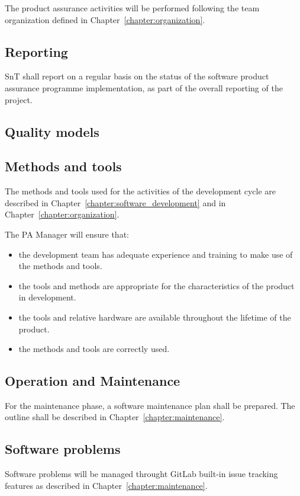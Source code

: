 The product assurance activities will be performed following the team organization defined in Chapter~\ref{chapter:organization}.

\subsection{Reporting}
SnT shall report on a regular basis on the status of the software product assurance programme implementation, as part of the overall reporting of the project.

\subsection{Quality models}

\subsection{Methods and tools}

The methods and tools used for the activities of the development cycle are described in Chapter~\ref{chapter:software_development} and in Chapter~\ref{chapter:organization}.

The PA Manager will ensure that:
\begin{itemize}
  \item the development team has adequate experience and training to make use of  the methods and tools.
  \item the tools and methods are appropriate for the characteristics of the product in development.
  \item the tools and relative hardware are available throughout the lifetime of the product.
  \item the methods and tools are correctly used.
\end{itemize}


\subsection{Operation and Maintenance}
For the maintenance phase, a software maintenance plan shall be prepared.
The outline shall be described in Chapter~\ref{chapter:maintenance}.

\subsection{Software problems}

Software problems will be managed throught GitLab built-in issue tracking features as described in Chapter~\ref{chapter:maintenance}.
